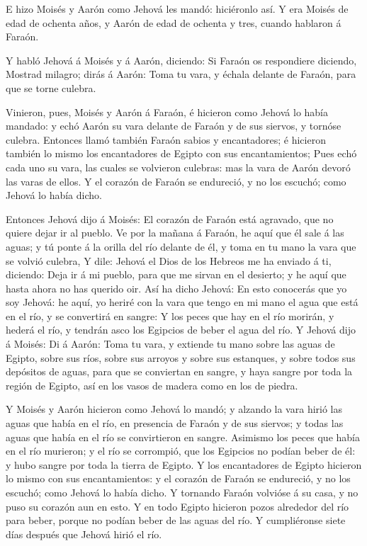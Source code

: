  E hizo Moisés y Aarón como Jehová les mandó: hiciéronlo
así.  Y era Moisés de edad de ochenta años, y Aarón de edad
de ochenta y tres, cuando hablaron á Faraón.

 Y habló Jehová á Moisés y á Aarón, diciendo: 
Si Faraón os respondiere diciendo, Mostrad milagro; dirás á Aarón: Toma
tu vara, y échala delante de Faraón, para que se torne culebra.

 Vinieron, pues, Moisés y Aarón á Faraón, é hicieron como
Jehová lo había mandado: y echó Aarón su vara delante de Faraón y de sus
siervos, y tornóse culebra.  Entonces llamó también Faraón
sabios y encantadores; é hicieron también lo mismo los encantadores de
Egipto con sus encantamientos;  Pues echó cada uno su vara,
las cuales se volvieron culebras: mas la vara de Aarón devoró las varas
de ellos.  Y el corazón de Faraón se endureció, y no los
escuchó; como Jehová lo había dicho.

 Entonces Jehová dijo á Moisés: El corazón de Faraón está
agravado, que no quiere dejar ir al pueblo.  Ve por la
mañana á Faraón, he aquí que él sale á las aguas; y tú ponte á la orilla
del río delante de él, y toma en tu mano la vara que se volvió culebra,
 Y dile: Jehová el Dios de los Hebreos me ha enviado á ti,
diciendo: Deja ir á mi pueblo, para que me sirvan en el desierto; y he
aquí que hasta ahora no has querido oir.  Así ha dicho
Jehová: En esto conocerás que yo soy Jehová: he aquí, yo heriré con la
vara que tengo en mi mano el agua que está en el río, y se convertirá en
sangre:  Y los peces que hay en el río morirán, y hederá el
río, y tendrán asco los Egipcios de beber el agua del río. 
Y Jehová dijo á Moisés: Di á Aarón: Toma tu vara, y extiende tu mano
sobre las aguas de Egipto, sobre sus ríos, sobre sus arroyos y sobre sus
estanques, y sobre todos sus depósitos de aguas, para que se conviertan
en sangre, y haya sangre por toda la región de Egipto, así en los vasos
de madera como en los de piedra.

 Y Moisés y Aarón hicieron como Jehová lo mandó; y alzando
la vara hirió las aguas que había en el río, en presencia de Faraón y de
sus siervos; y todas las aguas que había en el río se convirtieron en
sangre.  Asimismo los peces que había en el río murieron; y
el río se corrompió, que los Egipcios no podían beber de él: y hubo
sangre por toda la tierra de Egipto.  Y los encantadores de
Egipto hicieron lo mismo con sus encantamientos: y el corazón de Faraón
se endureció, y no los escuchó; como Jehová lo había dicho.
 Y tornando Faraón volvióse á su casa, y no puso su corazón
aun en esto.  Y en todo Egipto hicieron pozos alrededor del
río para beber, porque no podían beber de las aguas del río.
 Y cumpliéronse siete días después que Jehová hirió el río.

